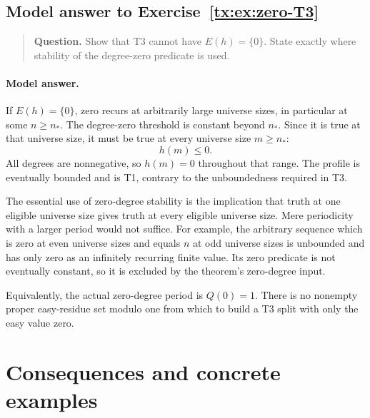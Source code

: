\documentclass[11pt,a4paper,oneside,openany]{book}
\theoremstyle{definition}\newtheorem{definition}[theorem]{Definition}
\theoremstyle{remark}\newtheorem{remark}[theorem]{Remark}
\numberwithin{equation}{chapter}
\begin{document}
\begin{samepage}

\subsection*{Model answer to Exercise~\ref{tx:ex:zero-T3}}\label{tx:ans:zero-T3}

\begin{quote}\small\textbf{Question.} Show that T3 cannot have $E(h)=\{0\}$. State exactly where stability of
the degree-zero predicate is used.
\end{quote}

\paragraph{Model answer.}
If \(E(h)=\{0\}\), zero recurs at arbitrarily large universe sizes, in
particular at some \(n\ge n_*\). The degree-zero threshold is
constant beyond \(n_*\). Since it is true at that universe size, it must
be true at every universe size \(m\ge n_*\):
\[
                              h(m)\le0.
\]
All degrees are nonnegative, so \(h(m)=0\) throughout that range.
The profile is eventually bounded and is T1, contrary to the
unboundedness required in T3.
\end{samepage}

The essential use of zero-degree stability is the implication
that truth at one eligible universe size gives truth at every eligible universe size.
Mere periodicity with a larger period would not suffice. For example,
the arbitrary sequence which is zero at even universe sizes and equals \(n\)
at odd universe sizes is unbounded and has only zero as an infinitely recurring
finite value. Its zero predicate is not eventually constant, so it
is excluded by the theorem's zero-degree input.

Equivalently, the actual zero-degree period is \(Q(0)=1\).
There is no nonempty proper easy-residue set modulo one from which
to build a T3 split with only the easy value zero.


\par


\section{Consequences and concrete examples}
\end{document}
